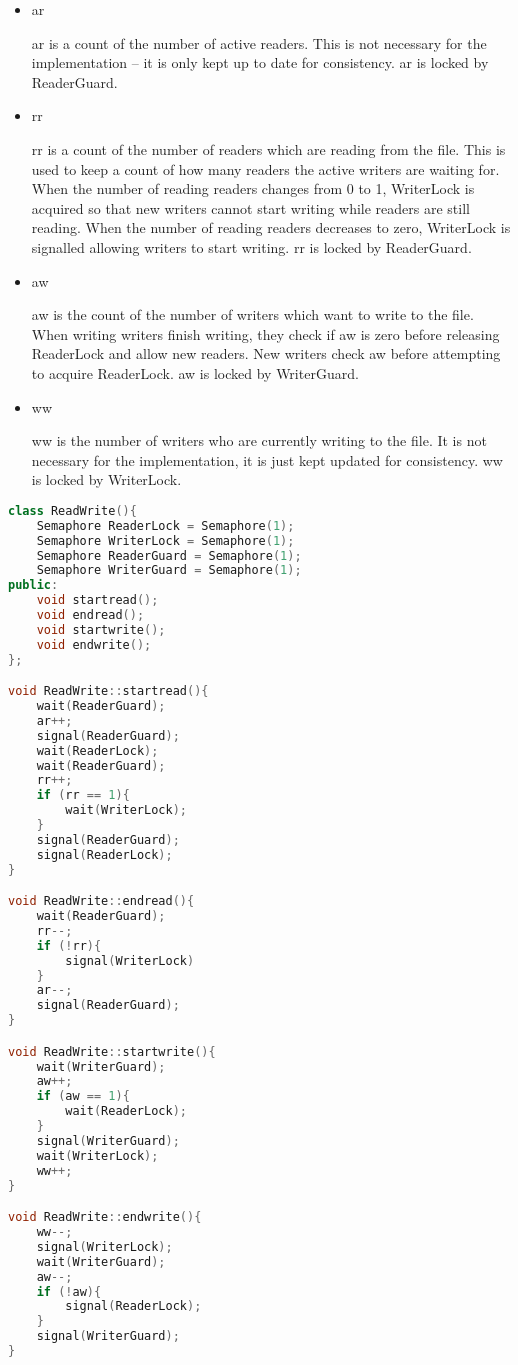 \documentclass[10pt,\jkfside,a4paper]{article}
\begin{document}
\begin{itemize}

\item ar

ar is a count of the number of active readers. This is not necessary for the
implementation -- it is only kept up to date for consistency. ar is locked
by ReaderGuard.

\item rr

rr is a count of the number of readers which are reading from the file. This
is used to keep a count of how many readers the active writers are waiting for.
When the number of reading readers changes from 0 to 1, WriterLock is
acquired so that new writers cannot start writing while readers are still
reading. When the number of reading readers decreases to zero, WriterLock is
signalled allowing writers to start writing. rr is locked by ReaderGuard.

\item aw

aw is the count of the number of writers which want to write to the file.
When writing writers finish writing, they check if aw is zero before releasing
ReaderLock and allow new readers. New writers check aw before attempting to
acquire ReaderLock. aw is locked by WriterGuard.

\item ww

ww is the number of writers who are currently writing to the file. It is not
necessary for the implementation, it is just kept updated for consistency.
ww is locked by WriterLock.

\end{itemize}

\begin{lstlisting}[language=C++]
class ReadWrite(){
	Semaphore ReaderLock = Semaphore(1);
	Semaphore WriterLock = Semaphore(1);
	Semaphore ReaderGuard = Semaphore(1);
	Semaphore WriterGuard = Semaphore(1);
public:
	void startread();
	void endread();
	void startwrite();
	void endwrite();
};

void ReadWrite::startread(){
	wait(ReaderGuard);
	ar++;
	signal(ReaderGuard);
	wait(ReaderLock);
	wait(ReaderGuard);
	rr++;
	if (rr == 1){
		wait(WriterLock);
	}
	signal(ReaderGuard);
	signal(ReaderLock);
}

void ReadWrite::endread(){
	wait(ReaderGuard);
	rr--;
	if (!rr){
		signal(WriterLock)
	}
	ar--;
	signal(ReaderGuard);
}

void ReadWrite::startwrite(){
	wait(WriterGuard);
	aw++;
	if (aw == 1){
		wait(ReaderLock);
	}
	signal(WriterGuard);
	wait(WriterLock);
	ww++;
}

void ReadWrite::endwrite(){
	ww--;
	signal(WriterLock);
	wait(WriterGuard);
	aw--;
	if (!aw){
		signal(ReaderLock);
	}
	signal(WriterGuard);
}

\end{lstlisting}
\end{document}
